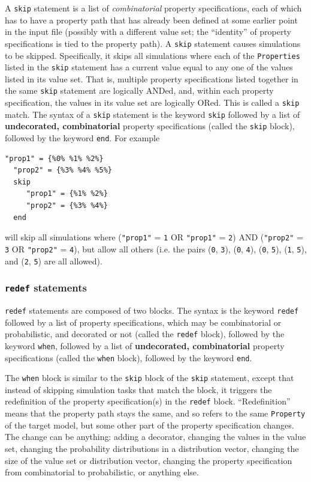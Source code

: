\documentclass{article}
\begin{document}
A {\tt skip} statement is a list of \textit{combinatorial} property specifications, each of which has to have a property path that has already been defined at some earlier point in the input file (possibly with a different value set; the ``identity'' of property specifications is tied to the property path). A {\tt skip} statement causes simulations to be skipped. Specifically, it skips all simulations where each of the {\tt Properties} listed in the {\tt skip} statement has a current value equal to any one of the values listed in its value set. That is, multiple property specifications listed together in the same {\tt skip} statement are logically ANDed, and, within each property specification, the values in its value set are logically ORed. This is called a {\tt skip} match. The syntax of a {\tt skip} statement is the keyword {\tt skip} followed by a list of \textbf{undecorated, combinatorial} property specifications (called the {\tt skip} block), followed by the keyword {\tt end}. For example

\begin{lstlisting}[]
  "prop1" = {%0% %1% %2%}
  "prop2" = {%3% %4% %5%}
  skip
     "prop1" = {%1% %2%}
     "prop2" = {%3% %4%}
  end
\end{lstlisting}

will skip all simulations where ({\tt "prop1"} = {\tt 1} OR {\tt "prop1"} = {\tt 2}) AND ({\tt "prop2"} = {\tt 3} OR {\tt "prop2"} = {\tt 4}), but allow all others (i.e. the pairs ({\tt 0}, {\tt 3}), ({\tt 0}, {\tt 4}), ({\tt 0}, {\tt 5}), ({\tt 1}, {\tt 5}), and ({\tt 2}, {\tt 5}) are all allowed).

\subsubsection{{\tt redef} statements}

{\tt redef} statements are composed of two blocks. The syntax is the keyword {\tt redef} followed by a list of property specifications, which may be combinatorial or probabilistic, and decorated or not (called the {\tt redef} block), followed by the keyword {\tt when}, followed by a list of \textbf{undecorated, combinatorial} property specifications (called the {\tt when} block), followed by the keyword {\tt end}.

The {\tt when} block is similar to the {\tt skip} block of the {\tt skip} statement, except that instead of skipping simulation tasks that match the block, it triggers the redefinition of the property specification(s) in the {\tt redef} block. ``Redefinition'' means that the property path stays the same, and so refers to the same {\tt Property} of the target model, but some other part of the property specification changes. The change can be anything: adding a decorator, changing the values in the value set, changing the probability distributions in a distribution vector, changing the size of the value set or distribution vector, changing the property specification from combinatorial to probabilistic, or anything else.
\end{document}
